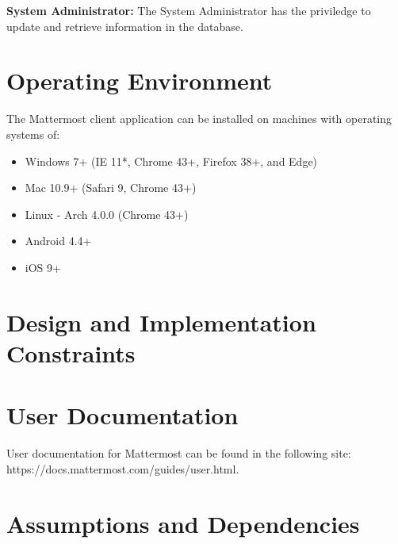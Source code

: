 \documentclass{scrreprt}
\newcommand\tab[1][0.5cm]{\hspace*{#1}}
\begin{document}
\noindent
\textbf{System Administrator:}
\tab The System Administrator has the priviledge to update and retrieve
information in the database.

\section{Operating Environment}
The Mattermost client application can be installed on machines with operating
systems of:
\begin{itemize}
\item Windows 7+ (IE 11*, Chrome 43+, Firefox 38+, and Edge)
\item Mac 10.9+ (Safari 9, Chrome 43+)
\item Linux - Arch 4.0.0 (Chrome 43+)
\item Android 4.4+
\item iOS 9+
\end{itemize}

\section{Design and Implementation Constraints}

\section{User Documentation}
User documentation for Mattermost can be found in the following site:
https://docs.mattermost.com/guides/user.html.

\section{Assumptions and Dependencies}
\end{document}
